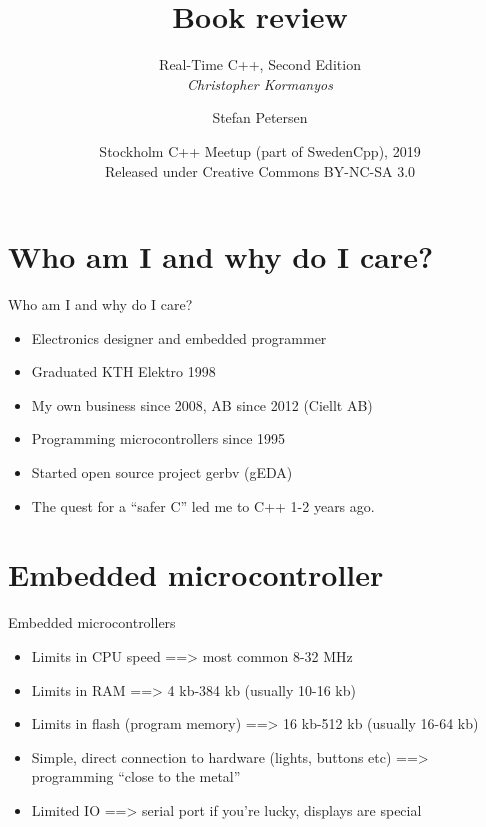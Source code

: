 \documentclass{beamer}
\title{Book review }
\subtitle{Real-Time C++, Second Edition \\ \emph{Christopher Kormanyos}}
\author{Stefan Petersen}
\date[2019-02-21]{Stockholm C++ Meetup (part of SwedenCpp), 2019 \\
  Released under Creative Commons BY-NC-SA 3.0 \\
  \cc \byncsa}
\begin{document}
\begin{frame}
  \titlepage
\end{frame}
\section{Who am I and why do I care?}
\begin{frame}{Who am I and why do I care?}
  \begin{itemize}
  \item Electronics designer and embedded programmer
  \item Graduated KTH Elektro 1998
  \item My own business since 2008, AB since 2012 (Ciellt AB)
  \item Programming microcontrollers since 1995
  \item Started open source project gerbv (gEDA)
  \item The quest for a ``safer C'' led me to C++ 1-2 years ago.
  \end{itemize}
\end{frame}

\section{Embedded microcontroller}

\begin{frame}{Embedded microcontrollers}
  \begin{itemize}
  \item  Limits in CPU speed
    \pause ==> most common 8-32 MHz
    \pause \item Limits in RAM
    \pause ==> 4 kb-384 kb (usually 10-16 kb)
    \pause \item Limits in flash (program memory)
    \pause ==> 16 kb-512 kb (usually 16-64 kb)
    \pause \item Simple, direct connection to hardware (lights, buttons etc)
    \pause ==> programming ``close to the metal''
    \pause \item Limited IO
    \pause ==> serial port if you're lucky, displays are special
  \end{itemize}
\end{frame}
\end{document}
